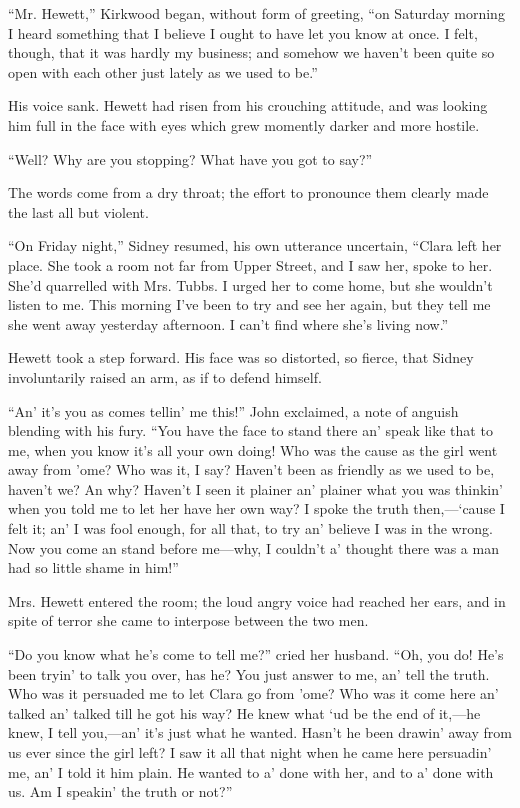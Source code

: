 ``Mr. Hewett,'' Kirkwood began, without form of greeting, ``on Saturday
morning I heard something that I believe I ought to have let you know at
once. I felt, though, that it was hardly my business; and somehow we
haven't been quite so open with each other just lately as we used to
be.''

His voice sank. Hewett had risen from his crouching attitude, and was
looking him full in the face with eyes which grew momently darker and
more hostile.

{\protect\hypertarget{284}{}{}}``Well? Why are you stopping? What have
you got to say?''

The words come from a dry throat; the effort to pronounce them clearly
made the last all but violent.

``On Friday night,'' Sidney resumed, his own utterance uncertain,
``Clara left her place. She took a room not far from Upper Street, and I
saw her, spoke to her. She'd quarrelled with Mrs. Tubbs. I urged her to
come home, but she wouldn't listen to me. This morning I've been to try
and see her again, but they tell me she went away yesterday afternoon. I
can't find where she's living now.''

Hewett took a step forward. His face was so distorted, so fierce, that
Sidney involuntarily raised an arm, as if to defend himself.

``An' it's you as comes tellin' me this!'' John exclaimed, a note of
anguish blending with his fury. ``You have the face to stand there an'
speak like that to me, when you know it's all your own doing! Who was
the cause as the girl went away from 'ome? Who was it, I say? Haven't
been as friendly as we {\protect\hypertarget{285}{}{}}used to be,
haven't we? An why? Haven't I seen it plainer an' plainer what you was
thinkin' when you told me to let her have her own way? I spoke the truth
then,---`cause I felt it; an' I was fool enough, for all that, to try
an' believe I was in the wrong. Now you come an stand before me---why, I
couldn't a' thought there was a man had so little shame in him!''

Mrs. Hewett entered the room; the loud angry voice had reached her ears,
and in spite of terror she came to interpose between the two men.

``Do you know what he's come to tell me?'' cried her husband. ``Oh, you
do! He's been tryin' to talk you over, has he? You just answer to me,
an' tell the truth. Who was it persuaded me to let Clara go from 'ome?
Who was it come here an' talked an' talked till he got his way? He knew
what `ud be the end of it,---he knew, I tell you,---an' it's just what
he wanted. Hasn't he been drawin' away from us ever since the girl left?
I saw it all that night when he came here persuadin'
{\protect\hypertarget{286}{}{}}me, an' I told it him plain. He wanted to
a' done with her, and to a' done with us. Am I speakin' the truth or
not?''

